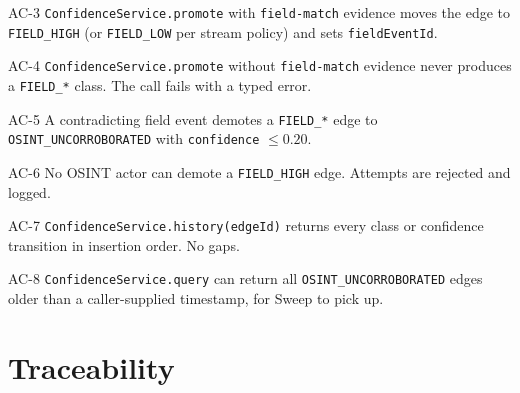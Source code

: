 \begin{ac}{AC-3}
\texttt{ConfidenceService.promote} with \texttt{field-match} evidence moves the edge to \texttt{FIELD\_HIGH} (or \texttt{FIELD\_LOW} per stream policy) and sets \texttt{fieldEventId}.
\end{ac}

\begin{ac}{AC-4}
\texttt{ConfidenceService.promote} without \texttt{field-match} evidence never produces a \texttt{FIELD\_*} class. The call fails with a typed error.
\end{ac}

\begin{ac}{AC-5}
A contradicting field event demotes a \texttt{FIELD\_*} edge to \texttt{OSINT\_UNCORROBORATED} with \texttt{confidence} $\leq 0.20$.
\end{ac}

\begin{ac}{AC-6}
No OSINT actor can demote a \texttt{FIELD\_HIGH} edge. Attempts are rejected and logged.
\end{ac}

\begin{ac}{AC-7}
\texttt{ConfidenceService.history(edgeId)} returns every class or confidence transition in insertion order. No gaps.
\end{ac}

\begin{ac}{AC-8}
\texttt{ConfidenceService.query} can return all \texttt{OSINT\_UNCORROBORATED} edges older than a caller-supplied timestamp, for Sweep to pick up.
\end{ac}

\section{Traceability}

